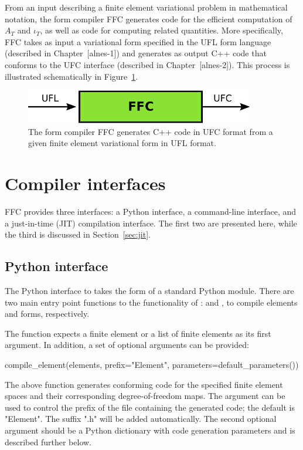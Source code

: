 From an input describing a finite element variational problem in
mathematical notation, the form compiler FFC generates code for the
efficient computation of $A_T$ and $\iota_T$, as well as code for
computing related quantities. More specifically, FFC takes as input a
variational form specified in the UFL form language (described in
Chapter~[alnes-1]) and generates as output C++ code that conforms to
the UFC interface (described in Chapter~[alnes-2]). This process is
illustrated schematically in Figure~\ref{fig:formcompiler}.

\begin{figure}
  \begin{center}
    \includegraphics[width=10cm]{chapters/logg-1/pdf/ufl_ffc_ufc.pdf}
    \caption{The form compiler FFC generates C++ code in UFC format
      from a given finite element variational form in UFL format.}
    \label{fig:formcompiler}
  \end{center}
\end{figure}

\section{Compiler interfaces}

FFC provides three interfaces: a Python interface, a
command-line interface, and a just-in-time (JIT) compilation
interface. The first two are presented here, while the third is
discussed in Section~\ref{sec:jit}.

\subsection{Python interface}

The Python interface to \ffc{} takes the form of a standard
Python module. There are two main entry point functions to the
functionality of \ffc{}:  and
, to compile elements and forms, respectively.

The  function expects a finite element or a
list of finite elements as its first argument. In addition, a set of
optional arguments can be provided:
%
\begin{python}
compile_element(elements,
                prefix="Element",
                parameters=default_parameters())
\end{python}
%
The above function generates \ufc{} conforming code for the specified
finite element spaces and their corresponding degree-of-freedom maps. The
 argument can be used to control the prefix of the
file containing the generated code; the default is "Element". The
suffix ".h" will be added automatically. The second optional argument
 should be a Python dictionary with code
generation parameters and is described further below.

